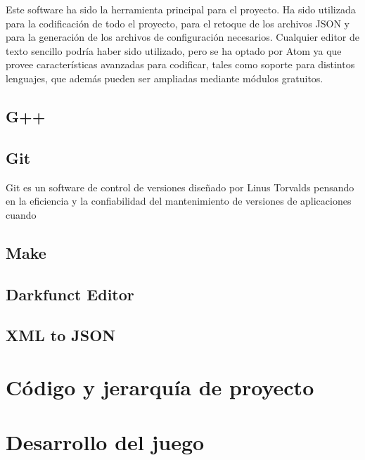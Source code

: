 		Este software ha sido la herramienta principal para el proyecto. Ha sido utilizada para la codificación de todo el proyecto, para el retoque de los archivos JSON y para la generación de los archivos de configuración necesarios. Cualquier editor de texto sencillo podría haber sido utilizado, pero se ha optado por Atom ya que provee características avanzadas para codificar, tales como soporte para distintos lenguajes, que además pueden ser ampliadas mediante módulos gratuitos.

	\subsection{G++}

	\subsection{Git}

		Git es un software de control de versiones diseñado por Linus Torvalds pensando en la eficiencia y la confiabilidad del mantenimiento de versiones de aplicaciones cuando

	\subsection{Make}

	\subsection{Darkfunct Editor}

	\subsection{XML to JSON}

\section{Código y jerarquía de proyecto}

\section{Desarrollo del juego}